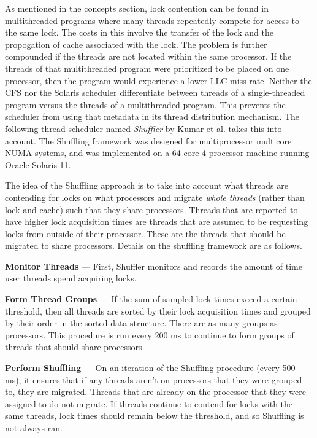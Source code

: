 \documentclass{sig-alternate}
\begin{document}
As mentioned in the concepts section, lock contention can be found in multithreaded programs where many threads repeatedly compete for access to the same lock. The costs in this involve the transfer of the lock and the propogation of cache associated with the lock. The problem is further compounded if the threads are not located within the same processor. If the threads of that multithreaded program were prioritized to be placed on one processor, then the program would experience a lower LLC miss rate. Neither the CFS nor the Solaris scheduler differentiate between threads of a single-threaded program versus the threads of a multithreaded program. This prevents the scheduler from using that metadata in its thread distribution mechanism. The following thread scheduler named \emph{Shuffler} by Kumar et al. takes this into account. The Shuffling framework was designed for multiprocessor multicore NUMA systems, and was implemented on a 64-core 4-processor machine running Oracle Solaris 11.~\cite{Kumar:2014}

The idea of the Shuffling approach is to take into account what threads are contending for locks on what processors and migrate \textit{whole threads} (rather than lock and cache) such that they share processors. Threads that are reported to have higher lock acquisition times are threads that are assumed to be requesting locks from outside of their processor. These are the threads that should be migrated to share processors. Details on the shuffling framework are as follows.~\cite{Kumar:2014}


\textbf{Monitor Threads} --- First, Shuffler monitors and records the amount of time user threads spend acquiring locks.

\vspace{1 mm}

\textbf{Form Thread Groups} --- If the sum of sampled lock times exceed a certain threshold, then all threads are sorted by their lock acquisition times and grouped by their order in the sorted data structure. There are as many groups as processors. This procedure is run every 200 ms to continue to form groups of threads that should share processors.

\vspace{1 mm}

\textbf{Perform Shuffling} --- On an iteration of the Shuffling procedure (every 500 ms), it ensures that if any threads aren't on processors that they were grouped to, they are migrated. Threads that are already on the processor that they were assigned to do not migrate. If threads continue to contend for locks with the same threads, lock times should remain below the threshold, and so Shuffling is not always ran.~\cite{Kumar:2014}
\end{document}
